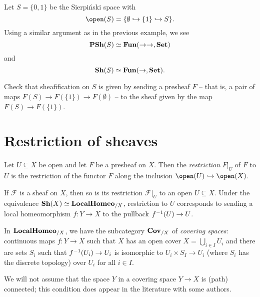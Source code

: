 \begin{exmp}
Let $S=\{0,1\}$ be the Sierpiński space with
\[ \open(S) = \{\emptyset\hookrightarrow\{1\}\hookrightarrow S\}\text{.} \]
Using a similar argument as in the previous example, we see
\[ \operatorname{\mathbf{PSh}}(S) \simeq \operatorname{\mathbf{Fun}}(\mathord{\to}\mathord{\to},\mathbf{Set}) \]
and
\[ \operatorname{\mathbf{Sh}}(S) \simeq \operatorname{\mathbf{Fun}}(\mathord{\to},\mathbf{Set})\text{.} \]
\end{exmp}

\begin{exc}
Check that sheafification on $S$ is given by sending a presheaf $F$ -- that is, a pair of maps $F(S)\to F(\{1\})\to F(\emptyset)$ -- to the sheaf given by the map $F(S)\to F(\{1\})$.
\end{exc}

\section{Restriction of sheaves}

\begin{defn}
Let $U\subseteq X$ be open and let $F$ be a presheaf on $X$.
Then the \emph{restriction} $F|_U$ of $F$ to $U$ is the restriction of the functor $F$ along the inclusion $\open(U)\hookrightarrow\open(X)$.
\end{defn}

\begin{lem}
If $\mathcal F$ is a sheaf on $X$, then so is its restriction $\mathcal F|_U$ to an open $U\subseteq X$.
Under the equivalence $\operatorname{\mathbf{Sh}}(X)\simeq\mathbf{LocalHomeo}_{/X}$, restriction to $U$ corresponds to sending a local homeomorphism $f\colon Y\to X$ to the pullback $f^{-1}(U)\to U$.
\end{lem}

In $\mathbf{LocalHomeo}_{/X}$, we have the subcategory $\mathbf{Cov}_{/X}$ of \emph{covering spaces}: continuous maps $f\colon Y\to X$ such that $X$ has an open cover $X = \bigcup_{i\in I}U_i$ and there are sets $S_i$ such that $f^{-1}(U_i)\to U_i$ is isomorphic to $U_i\times S_I\to U_i$ (where $S_i$ has the discrete topology) over $U_i$ for all $i\in I$.


\begin{rmk}
We will not assume that the space $Y$ in a covering space $Y\to X$ is (path) connected; this condition does appear in the literature with some authors.
\end{rmk}

